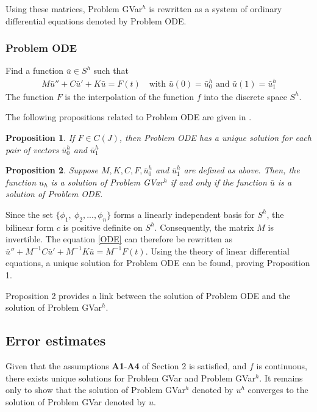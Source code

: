 \documentclass[../../main.tex]{subfiles}
\begin{document}
Using these matrices, Problem GVar$^h$ is rewritten as a system of ordinary differential equations denoted by Problem ODE.
\subsubsection*{Problem ODE}
Find a function $\bar{u} \in S^h$ such that
\begin{eqnarray}
	M\bar{u}'' + C \bar{u}' + K\bar{u} = F(t) \ \ \ \textrm{ with } \bar{u}(0) = \bar{u}^h_0 \textrm{ and }  \bar{u}(1) = \bar{u}^h_1 \label{ODE}
\end{eqnarray}
The function $F$ is the interpolation of the function $f$ into the discrete space $S^h$.

The following propositions related to Problem ODE are given in \cite{BV13}.

\newtheorem{DC_Prop2}{Proposition}
\begin{DC_Prop2}
	If $F\in C(J)$, then Problem ODE has a unique solution for each pair of vectors $\bar{u}^h_0$ and $\bar{u}^h_1$
\end{DC_Prop2}

\newtheorem{DC_Prop3}[DC_Prop2]{Proposition}
\begin{DC_Prop3}
	Suppose $M, K, C, F,\bar{u}^h_0$ and $\bar{u}^h_1$ are defined as above. Then, the function $u_{h}$ is a solution of Problem GVar$^{h}$ if and only if the function $\bar{u}$ is a solution of Problem ODE.
\end{DC_Prop3}

Since the set $\{\phi_1, \ \phi_2,...,\phi_n\}$ forms a linearly independent basis for $S^h$, the bilinear form $c$ is positive definite on $S^h$. Consequently, the matrix $M$ is invertible. The equation \eqref{ODE} can therefore be rewritten as $\bar{u}'' + M^{-1}C\bar{u}' + M^{-1}K \bar{u} = M^{-1}F(t)$. Using the theory of linear differential equations, a unique solution for Problem ODE can be found, proving Proposition 1.

Proposition 2 provides a link between the solution of Problem ODE and the solution of Problem GVar$^h$.

\subsection{Error estimates}\label{e_est}
Given that the assumptions \textbf{A1}-\textbf{A4} of Section 2 is satisfied, and $f$ is continuous, there exists unique solutions for  Problem GVar and Problem GVar$^h$. It remains only to show that the solution of Problem GVar$^h$ denoted by $u^h$ converges to the solution of Problem GVar denoted by $u$.
\end{document}
